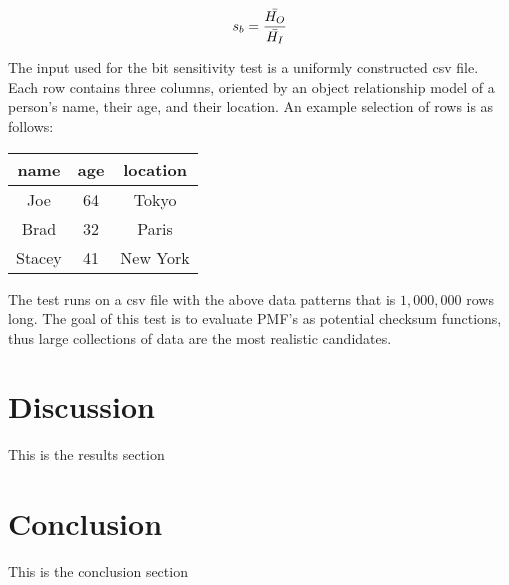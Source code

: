 \documentclass{article}
\begin{document}
$$
   s_b = \frac{\Bar{H_O}}{\Bar{H_I}}
$$

The input used for the bit sensitivity test is a uniformly constructed csv file. Each row contains three columns, oriented by an object relationship model of a person's name, their age, and their location. An example selection of rows is as follows:

\vspace{5}
\begin{tabular}{ c  c  c }
  name & age & location \\
  \hline
  Joe & 64 & Tokyo \\
  Brad & 32 & Paris \\
  Stacey & 41 & New York \\
\end{tabular}

The test runs on a csv file with the above data patterns that is $1,000,000$ rows long. The goal of this test is to evaluate PMF's as potential checksum functions, thus large collections of data are the most realistic candidates.

\section{Discussion}

This is the results section



\section{Conclusion}
This is the conclusion section



\end{document}
